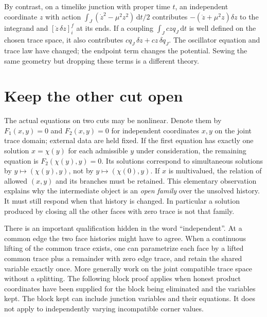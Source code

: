 By contrast, on a timelike junction with proper time $t$, an independent coordinate $z$ with action $\int_J(\dot z^2-\mu^2z^2)\,\mathrm{d}t/2$ contributes $-(\ddot z+\mu^2z)\delta z$ to the integrand and $[\dot z\,\delta z]_i^f$ at its ends. If a coupling $\int_J c z q_J\,\mathrm{d}t$ is well defined on the chosen trace space, it also contributes $c q_J\,\delta z+c z\,\delta q_J$. The oscillator equation and trace law have changed; the endpoint term changes the potential. Sewing the same geometry but dropping these terms is a different theory.

\section{Keep the other cut open}

The actual equations on two cuts may be nonlinear. Denote them by $F_1(x,y)=0$ and $F_2(x,y)=0$ for independent coordinates $x,y$ on the joint trace domain; external data are held fixed. If the first equation has exactly one solution $x=\chi(y)$ for each admissible $y$ under consideration, the remaining equation is $F_2(\chi(y),y)=0$. Its solutions correspond to simultaneous solutions by $y\mapsto(\chi(y),y)$, not by $y\mapsto(\chi(0),y)$. If $x$ is multivalued, the relation of allowed $(x,y)$ and its branches must be retained. This elementary observation explains why the intermediate object is an \emph{open family} over the unsolved history. It must still respond when that history is changed. In particular a solution produced by closing all the other faces with zero trace is not that family.

There is an important qualification hidden in the word ``independent''. At a common edge the two face histories might have to agree. When a continuous lifting of the common trace exists, one can parametrize each face by a lifted common trace plus a remainder with zero edge trace, and retain the shared variable exactly once. More generally work on the joint compatible trace space without a splitting. The following block proof applies when honest product coordinates have been supplied for the block being eliminated and the variables kept. The block kept can include junction variables and their equations. It does not apply to independently varying incompatible corner values.

